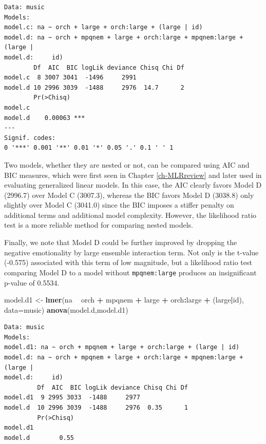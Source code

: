 \documentclass[
]{krantz}
\newenvironment{Shaded}{\begin{snugshade}}{\end{snugshade}}
\newcommand{\DataTypeTok}[1]{\textcolor[rgb]{0.27,0.27,0.27}{#1}}
\newcommand{\KeywordTok}[1]{\textcolor[rgb]{0.27,0.27,0.27}{\textbf{#1}}}
\newcommand{\NormalTok}[1]{#1}
\newcommand{\OperatorTok}[1]{\textcolor[rgb]{0.43,0.43,0.43}{\textbf{#1}}}
\newcommand{\StringTok}[1]{\textcolor[rgb]{0.5,0.5,0.5}{#1}}
\begin{document}
\begin{verbatim}
Data: music
Models:
model.c: na ~ orch + large + orch:large + (large | id)
model.d: na ~ orch + mpqnem + large + orch:large + mpqnem:large + (large | 
model.d:     id)
        Df  AIC  BIC logLik deviance Chisq Chi Df
model.c  8 3007 3041  -1496     2991             
model.d 10 2996 3039  -1488     2976  14.7      2
        Pr(>Chisq)    
model.c               
model.d    0.00063 ***
---
Signif. codes:  
0 '***' 0.001 '**' 0.01 '*' 0.05 '.' 0.1 ' ' 1
\end{verbatim}

Two models, whether they are nested or not, can be compared using AIC and BIC measures, which were first seen in Chapter \ref{ch-MLRreview} and later used in evaluating generalized linear models. In this case, the AIC clearly favors Model D (2996.7) over Model C (3007.3), whereas the BIC favors Model D (3038.8) only slightly over Model C (3041.0) since the BIC imposes a stiffer penalty on additional terms and additional model complexity. However, the likelihood ratio test is a more reliable method for comparing nested models.

Finally, we note that Model D could be further improved by dropping the negative emotionality by large ensemble interaction term. Not only is the t-value (-0.575) associated with this term of low magnitude, but a likelihood ratio test comparing Model D to a model without \texttt{mpqnem:large} produces an insignificant p-value of 0.5534.

\begin{Shaded}
\begin{Highlighting}[]
\NormalTok{model.d1 <-}\StringTok{ }\KeywordTok{lmer}\NormalTok{(na }\OperatorTok{~}\StringTok{ }\NormalTok{orch }\OperatorTok{+}\StringTok{ }\NormalTok{mpqnem }\OperatorTok{+}\StringTok{ }\NormalTok{large }\OperatorTok{+}\StringTok{ }\NormalTok{orch}\OperatorTok{:}\NormalTok{large }\OperatorTok{+}\StringTok{ }
\StringTok{  }\NormalTok{(large}\OperatorTok{|}\NormalTok{id), }\DataTypeTok{data=}\NormalTok{music)}
\KeywordTok{anova}\NormalTok{(model.d,model.d1)}
\end{Highlighting}
\end{Shaded}

\begin{verbatim}
Data: music
Models:
model.d1: na ~ orch + mpqnem + large + orch:large + (large | id)
model.d: na ~ orch + mpqnem + large + orch:large + mpqnem:large + (large | 
model.d:     id)
         Df  AIC  BIC logLik deviance Chisq Chi Df
model.d1  9 2995 3033  -1488     2977             
model.d  10 2996 3039  -1488     2976  0.35      1
         Pr(>Chisq)
model.d1           
model.d        0.55
\end{verbatim}
\end{document}
